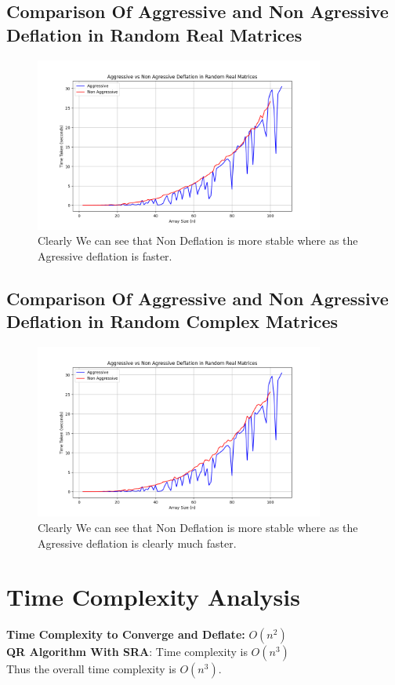 \documentclass[12pt]{article}
\begin{document}
 	\subsection{Comparison Of Aggressive and Non Agressive Deflation in Random Real Matrices}
 	\begin{figure}[h]
 		\centering
 		\includegraphics[width=0.85\textwidth]{figs/com1.png}
 		\caption{Clearly We can see that Non Deflation is more stable where as the Agressive deflation is faster.}
 	\end{figure}
 	\subsection{Comparison Of Aggressive and Non Agressive Deflation in Random Complex Matrices}
 	\begin{figure}[h]
 		\centering
 		\includegraphics[width=0.85\textwidth]{figs/com2.png}
 		\caption{Clearly We can see that Non Deflation is more stable where as the Agressive deflation is clearly much faster.}
 	\end{figure}
 	\newpage
 	\section{Time Complexity Analysis}
 	\textbf{Time Complexity to Converge and Deflate: } $O(n^2)$\\
 	\textbf{QR Algorithm With SRA}: Time complexity is $O(n^3)$\\
 	Thus the overall time complexity is $O(n^3)$.
\end{document}
